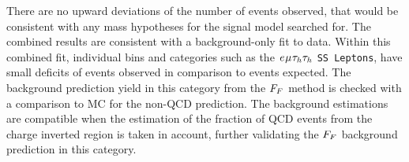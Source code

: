 There are no upward deviations of the number of events observed, that would be consistent with any mass hypotheses for the signal model searched for.
The combined results are consistent with a background-only fit to data.
Within this combined fit, individual bins and categories such as the $e_{}\mu_{}\tau_{h}\tau_{h}$ \texttt{SS Leptons}, have small deficits of events observed in comparison to events expected.
The background prediction yield in this category from the $F_{F}$ method is checked with a comparison to \ac{MC} for the non-\ac{QCD} prediction.
The background estimations are compatible when the estimation of the fraction of \ac{QCD} events from the charge inverted region is taken in account, further validating the $F_{F}$ background prediction in this category.


\begin{figure}[!hbtp]
\centering
     \\

\end{figure}
